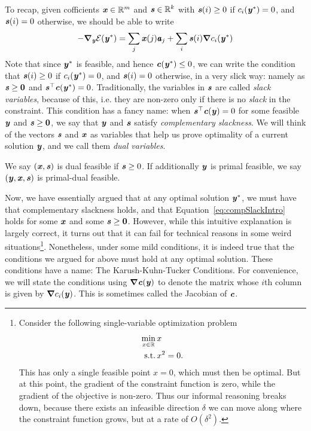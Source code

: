 To recap, given cofficients $\xx \in \R^m$ and $\ss \in \R^k$ with
$\ss(i) \geq 0$ if $c_i(\yy^*) = 0$, and $\ss(i) = 0$ otherwise, we
should be able to write
\begin{align}
  -\grad_{\yy}\calE(\yy^*) = \sum_{j} \xx(j) \aa_j + \sum_{i}
  \ss(i)\grad c_i(\yy^*)
  \label{eq:compSlackIntro}
\end{align}
  Note that since $\yy^*$ is feasible, and hence $\cc(\yy^*) \leq 0$,
  we can write the condition that
$\ss(i) \geq 0$ if $c_i(\yy^*) = 0$, and $\ss(i) = 0$ otherwise, in a
very slick way: namely as $\ss \geq \veczero$ and $\ss^{\top}
\cc(\yy^*) = 0$.
Traditionally, the variables in $\ss$ are called \emph{slack
  variables}, because of this, i.e. they are non-zero only if there is
no \emph{slack} in the constraint. 
This condition has a fancy name: when $\ss^{\top}
\cc(\yy) = 0$ for some feasible $\yy$ and $\ss \geq \veczero$, we say
that $\yy$ and $\ss$ satisfy \emph{complementary slackness}.
%
We will think of the vectors $\ss$ and $\xx$ as variables that help
us prove optimality of a current solution $\yy$, and we call them
\emph{dual variables}.

\begin{definition}
We say $(\xx, \ss)$ is dual feasible if $\ss \geq 0$.
If additionally $\yy$ is primal feasible, we say $(\yy, \xx, \ss)$ is primal-dual feasible.
\end{definition}

Now, we have essentially argued that at any optimal solution
$\yy^*$, we must have that complementary slackness holds, and that
Equation~\eqref{eq:compSlackIntro} holds for some $\xx$ and some $\ss
\geq \veczero$.
However, while this intuitive explanation is largely correct, it turns
out that it can fail for technical reasons in some weird
situations\footnote{
  Consider the following single-variable optimization problem
  \begin{align*}
    \min_{x
    \in \R} &\, x
    \\
    \text{s.t.} & \, x^2 = 0.
  \end{align*}
  This has only a single feasible point $x = 0$, which must then be
  optimal.
  But at this point, the gradient of the constraint function is zero,
  while the gradient of the objective is non-zero.
  Thus our informal reasoning breaks down, because there exists an infeasible
  direction $\delta$ we can move along where the constraint function grows, but
  at a rate of $O(\delta^2)$.
  }.
Nonetheless, under some mild conditions, it is indeed true that the 
conditions we argued for above must hold at any optimal solution.
These conditions have a name: The Karush-Kuhn-Tucker Conditions.
For convenience, we will state the conditions using $\grad \cc(\yy)$
to denote the matrix whose $i$th column is given by $\grad c_i(\yy)$.
This is sometimes called the Jacobian of $\cc$.

